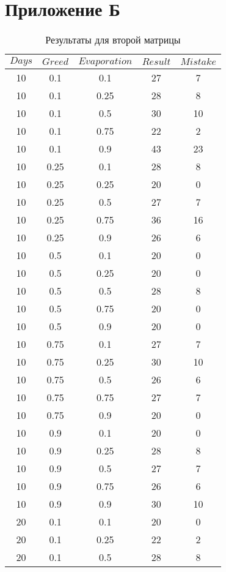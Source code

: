 \documentclass{bmstu}
\begin{document}
\chapter{Приложение Б}
\begin{center}
	\captionsetup{justification=raggedright,singlelinecheck=off}
	\begin{longtable}[c]{|c|c|c|c|c|}
		\caption{Результаты для второй матрицы\label{tbl:table_b}}\\ \hline
		$Days$ & $Greed$ & $Evaporation$ & $Result$ & $Mistake$ \\ \hline
		10 & 0.1 & 0.1 & 27 & 7 \\\hline
10 & 0.1 & 0.25 & 28 & 8 \\\hline
10 & 0.1 & 0.5 & 30 & 10 \\\hline
10 & 0.1 & 0.75 & 22 & 2 \\\hline
10 & 0.1 & 0.9 & 43 & 23 \\\hline
10 & 0.25 & 0.1 & 28 & 8 \\\hline
10 & 0.25 & 0.25 & 20 & 0 \\\hline
10 & 0.25 & 0.5 & 27 & 7 \\\hline
10 & 0.25 & 0.75 & 36 & 16 \\\hline
10 & 0.25 & 0.9 & 26 & 6 \\\hline
10 & 0.5 & 0.1 & 20 & 0 \\\hline
10 & 0.5 & 0.25 & 20 & 0 \\\hline
10 & 0.5 & 0.5 & 28 & 8 \\\hline
10 & 0.5 & 0.75 & 20 & 0 \\\hline
10 & 0.5 & 0.9 & 20 & 0 \\\hline
10 & 0.75 & 0.1 & 27 & 7 \\\hline
10 & 0.75 & 0.25 & 30 & 10 \\\hline
10 & 0.75 & 0.5 & 26 & 6 \\\hline
10 & 0.75 & 0.75 & 27 & 7 \\\hline
10 & 0.75 & 0.9 & 20 & 0 \\\hline
10 & 0.9 & 0.1 & 20 & 0 \\\hline
10 & 0.9 & 0.25 & 28 & 8 \\\hline
10 & 0.9 & 0.5 & 27 & 7 \\\hline
10 & 0.9 & 0.75 & 26 & 6 \\\hline
10 & 0.9 & 0.9 & 30 & 10 \\\hline
20 & 0.1 & 0.1 & 20 & 0 \\\hline
20 & 0.1 & 0.25 & 22 & 2 \\\hline
20 & 0.1 & 0.5 & 28 & 8 \\\hline

\end{longtable}
\end{center}
\end{document}
